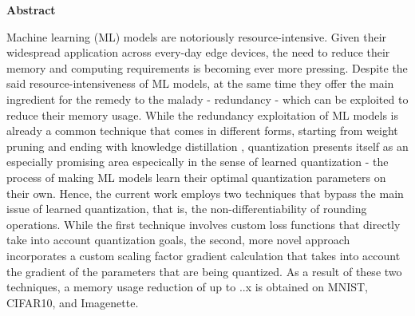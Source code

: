 \thispagestyle{empty}
\vspace*{1.0cm}

\begin{center}
    \textbf{Abstract} \label{abstract}
\end{center}

\vspace*{0.5cm}

\noindent Machine learning (ML) models are notoriously resource-intensive.
Given their widespread application across every-day edge devices,
the need to reduce their memory and computing requirements is becoming ever more pressing.
Despite the said resource-intensiveness of ML models, at the same time 
they offer the main ingredient for the remedy to the malady - redundancy - 
which can be exploited to reduce their memory usage.
While the redundancy exploitation of ML models is already a common 
technique that comes in different forms, starting from weight pruning \cite{DBLP:conf/iclr/MolchanovTKAK17}\cite{han2016deepcompression} and
ending with knowledge distillation \cite{DBLP:conf/icmlt/OkadoMIKS22}, quantization presents itself as an especially promising 
area especically in the sense of learned quantization - 
the process of making ML models learn their optimal quantization parameters
on their own.
Hence, the current work employs two techniques that bypass the main issue of learned quantization,
that is, the non-differentiability of rounding operations.
While the first technique involves custom loss functions that directly take into account
quantization goals, the second, more novel approach incorporates a custom scaling factor gradient calculation that takes into account 
the gradient of the parameters that are being quantized.
As a result of these two techniques, a memory usage reduction of up to ..x is obtained 
on MNIST, CIFAR10, and Imagenette. 